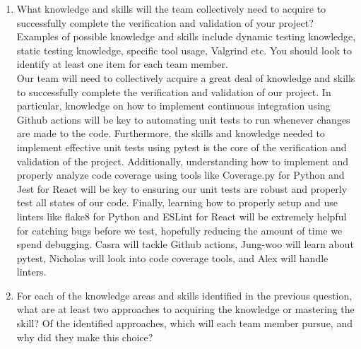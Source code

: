 \documentclass[12pt, titlepage]{article}
\begin{document}
  \begin{enumerate}
    \item What knowledge and skills will the team collectively need to acquire to
    successfully complete the verification and validation of your project?
    Examples of possible knowledge and skills include dynamic testing knowledge,
    static testing knowledge, specific tool usage, Valgrind etc.  You should look to
    identify at least one item for each team member.\\

    Our team will need to collectively acquire a great deal of knowledge and skills 
    to successfully complete the verification and validation of our project. In 
    particular, knowledge on how to implement continuous integration using Github 
    actions will be key to automating unit tests to run whenever changes are made 
    to the code. Furthermore, the skills and knowledge needed to implement effective 
    unit tests using pytest is the core of the verification and validation of the 
    project. Additionally, understanding how to implement and properly analyze code 
    coverage using tools like Coverage.py for Python and Jest for React will be key 
    to ensuring our unit tests are robust and properly test all states of our code. 
    Finally, learning how to properly setup and use linters like flake8 for Python 
    and ESLint for React will be extremely helpful for catching bugs before we test, 
    hopefully reducing the amount of time we spend debugging. Casra will tackle 
    Github actions, Jung-woo will learn about pytest, Nicholas will look into code 
    coverage tools, and Alex will handle linters.\\

    \item For each of the knowledge areas and skills identified in the previous
    question, what are at least two approaches to acquiring the knowledge or
    mastering the skill?  Of the identified approaches, which will each team
    member pursue, and why did they make this choice?\\


\end{enumerate}
\end{document}
